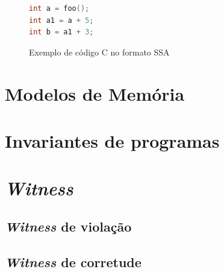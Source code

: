   \begin{figure}[H]
	\caption{\label{fig:progSSA}  Exemplo de código C no formato SSA }
	\begin{center}
    \begin{minipage}{0.5\textwidth}
    \begin{lstlisting}[language=C]       
int a = foo();
int a1 = a + 5; 
int b = a1 + 3;
	\end{lstlisting}
    \end{minipage}
	\end{center}
  \end{figure}


\section{Modelos de Memória}

\section{Invariantes de programas}

\section{\textit{Witness}}
\subsection{\textit{Witness} de violação}
\subsection{\textit{Witness} de corretude}


